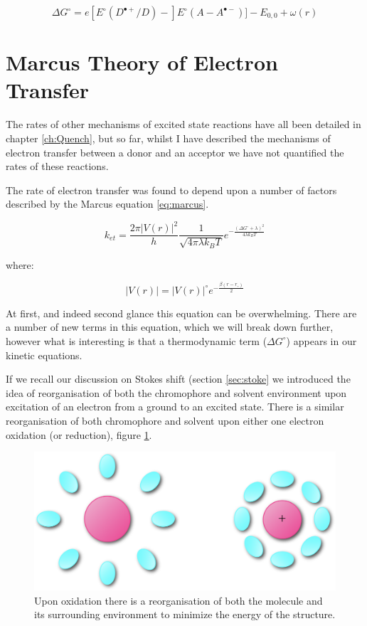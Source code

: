 \documentclass[
]{book}
\begin{document}
\begin{equation}
\Delta G ^\circ = e[E^\circ(D^{\bullet +}/D)-]E^\circ(A-A^{\bullet -})]-E_{0,0} + \omega (r)
\label{eq:rehmweller}
\end{equation}

\hypertarget{sec:marcus}{%
\section{Marcus Theory of Electron Transfer}\label{sec:marcus}}

The rates of other mechanisms of excited state reactions have all been detailed in chapter \ref{ch:Quench}, but so far, whilst I have described the mechanisms of electron transfer between a donor and an acceptor we have not quantified the rates of these reactions.

The rate of electron transfer was found to depend upon a number of factors described by the Marcus equation \eqref{eq:marcus}.

\begin{equation}
k_{et}=\frac{2 \pi |V(r)|^2}{h}\frac{1}{\sqrt{4 \pi \lambda k_B T}}e^{-\frac{(\Delta G^\circ+ \lambda)^2}{4 \lambda k_B T}}
\label{eq:marcus}
\end{equation}

where:

\begin{equation}
|V(r)|=|V(r)|^\circ e^{-\frac{\beta(r-r_\circ)}{2}}
\label{eq:coupel}
\end{equation}

At first, and indeed second glance this equation can be overwhelming. There are a number of new terms in this equation, which we will break down further, however what is interesting is that a thermodynamic term (\(\Delta G^\circ\)) appears in our kinetic equations.

If we recall our discussion on Stokes shift (section \ref{sec:stoke} we introduced the idea of reorganisation of both the chromophore and solvent environment upon excitation of an electron from a ground to an excited state. There is a similar reorganisation of both chromophore and solvent upon either one electron oxidation (or reduction), figure \ref{fig:elecreorg}.

\begin{figure}

{\centering \includegraphics[width=0.5\linewidth]{images/elecreorg} 

}

\caption{Upon oxidation there is a reorganisation of both the molecule and its surrounding environment to minimize the energy of the structure.}\label{fig:elecreorg}
\end{figure}
\end{document}
